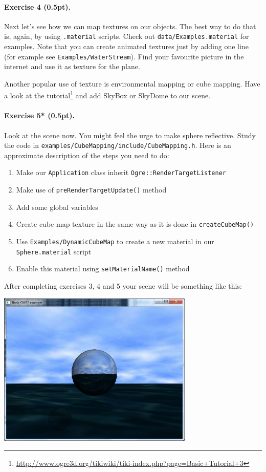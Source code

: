 \documentclass{article}
\newenvironment{exercise}[2]{\paragraph{Exercise #1 (#2pt).} }{
\medskip}
\begin{document}
\begin{exercise}{4}{0.5}
Next let's see how we can map textures on our objects. The best way to do that is, again, by using \verb#.material# scripts. Check out \verb#data/Examples.material# for examples. Note that you can create animated textures just by adding one line (for example see \verb#Examples/WaterStream#). Find your favourite picture in the internet and use it as texture for the plane.

Another popular use of texture is environmental mapping or cube mapping. Have a look at the tutorial\footnote{\url{http://www.ogre3d.org/tikiwiki/tiki-index.php?page=Basic+Tutorial+3}} and add SkyBox or SkyDome to our scene.
\end{exercise}

\begin{exercise}{5*}{0.5}
Look at the scene now. You might feel the urge to make sphere reflective. Study the code in \verb#examples/CubeMapping/include/CubeMapping.h#. Here is an approximate description of the steps you need to do:
\begin{enumerate}
	\item Make our \verb#Application# class inherit \verb#Ogre::RenderTargetListener#
	\item Make use of \verb#preRenderTargetUpdate()# method
	\item Add some global variables
	\item Create cube map texture in the same way as it is done in \verb#createCubeMap()#
	\item Use \verb#Examples/DynamicCubeMap# to create a new material in our \verb#Sphere.material# script
	\item Enable this material using \verb#setMaterialName()# method 	
\end{enumerate}
\end{exercise}
After completing exercises 3, 4 and 5 your scene will be something like this:
\begin{center}
\includegraphics[width=0.7\textwidth]{ex3-4-5.png}
\end{center}
\end{document}
